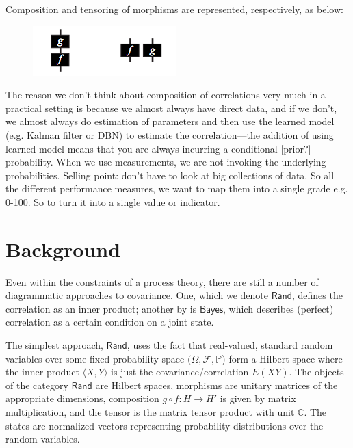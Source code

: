 \documentclass{sig-alternate-05-2015}
\theoremstyle{plain}
\theoremstyle{plain}
\theoremstyle{remark}
\newcommand{\Cat}[1]{\mathsf{#1}}
\def\Bayes{\Cat{Bayes}}
\def\Rand{\Cat{Rand}}
\begin{document}
Composition and tensoring of morphisms are represented, respectively, as below:
\begin{figure}[h!]
\centering
\includegraphics{composition}
\end{figure}

The reason we don't think about composition of correlations very much in a practical setting is because we almost always have direct data, and if we don't, we almost always do estimation of parameters and then use the learned model (e.g. Kalman filter or DBN) to estimate the correlation---the addition of using learned model means that you are always incurring a conditional [prior?] probability. When we use measurements, we are not invoking the underlying probabilities. Selling point: don't have to look at big collections of data. So all the different performance measures, we want to map them into a single grade e.g. 0-100. So to turn it into a single value or indicator.



\section{Background}
Even within the constraints of a process theory, there are still a number of diagrammatic approaches to covariance. One, which we denote $\Rand$, defines the correlation as an inner product; another by \cite{coecke_spekkens} is $\Bayes$, which describes (perfect) correlation as a certain condition on a joint state.

The simplest approach, $\Rand$, uses the fact that real-valued, standard random variables over some fixed probability space $(\Omega, \mathcal{F}, \mathbb{P}$) form a Hilbert space where the inner product $\langle X, Y \rangle$ is just the covariance/correlation $E(XY)$. The objects of the category $\Rand$ are Hilbert spaces, morphisms are unitary matrices of the appropriate dimensions, composition $g \circ f : H \to H'$ is given by matrix multiplication, and the tensor is the matrix tensor product with unit $\mathbb{C}$. The states are normalized vectors representing probability distributions over the random variables.
\end{document}
